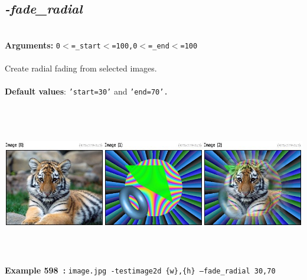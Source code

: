 \documentclass[a4paper,11pt,twoside]{book}
\begin{document}
\subsection{\emph{-fade\_radial} }\vspace*{-0.5em}
~\\\textbf{Arguments: } 
{\small \texttt{0$<$=\_start$<$=100,0$<$=\_end$<$=100}}\\~\\
Create radial fading from selected images.
~\\~\\\textbf{Default values}: {\small \texttt{'start=30'} and \texttt{'end=70'.}}
\begin{center}\includegraphics[keepaspectratio=true,height=7cm,width=\textwidth]{img/gmic_def598.jpg}\\
{\footnotesize \textbf{Example 598~:} \texttt{image.jpg -testimage2d \{w\},\{h\} --fade\_radial 30,70}}
\end{center}
\end{document}
